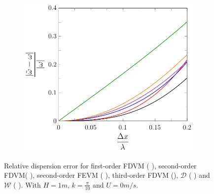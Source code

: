 \begin{figure}
\begin{subfigure}{0.5\textwidth}
	\end{subfigure}
	\par\bigskip
	\begin{subfigure}{0.5\textwidth}
		\includegraphics[width=\textwidth]{./chp4/figures/New/Dispu0Shall.pdf}
	\end{subfigure}
	\caption{Relative dispersion error for first-order FDVM ({\color{green!60!black} \solidrule}), second-order FDVM({\color{red} \solidrule}), second-order FEVM ({\color{blue} \solidrule}), third-order FDVM ({\solidrule}), $\mathcal{D}$ ({\color{violet!80!white} \solidrule}) and $\mathcal{W}$ ({\color{orange} \solidrule}). With $H = 1m$, $k = \frac{\pi}{10}$ and $U = 0 m/s$.}
	\label{fig:Dispu0Shall}
\end{figure}

